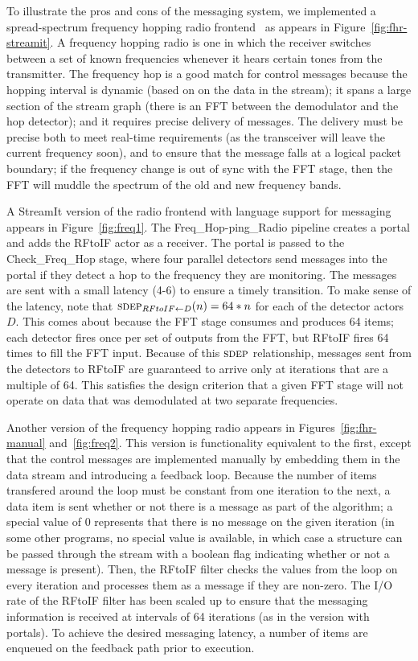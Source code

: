 To illustrate the pros and cons of the messaging system, we
implemented a spread-spectrum frequency hopping radio
frontend~\cite{harada02} as appears in Figure~\ref{fig:fhr-streamit}.
A frequency hopping radio is one in which the receiver switches
between a set of known frequencies whenever it hears certain tones
from the transmitter.  The frequency hop is a good match for control
messages because the hopping interval is dynamic (based on on the data
in the stream); it spans a large section of the stream graph (there is
an FFT between the demodulator and the hop detector); and it requires
precise delivery of messages.  The delivery must be precise both to
meet real-time requirements (as the transceiver will leave the current
frequency soon), and to ensure that the message falls at a logical
packet boundary; if the frequency change is out of sync with the FFT
stage, then the FFT will muddle the spectrum of the old and new
frequency bands.

A StreamIt version of the radio frontend with language support for
messaging appears in Figure~\ref{fig:freq1}.  The Freq\_Hop-ping\_Radio
pipeline creates a portal and adds the RFtoIF actor as a receiver.
The portal is passed to the Check\_Freq\_Hop stage, where four
parallel detectors send messages into the portal if they detect a hop
to the frequency they are monitoring.  The messages are sent with a
small latency (4-6) to ensure a timely transition.  To make sense of
the latency, note that $\sdepf{RFtoIF}{D}(n) = 64*n$ for each of the
detector actors $D$.  This comes about because the FFT stage consumes
and produces 64 items; each detector fires once per set of outputs
from the FFT, but RFtoIF fires 64 times to fill the FFT input.
Because of this $\textsc{sdep}$ relationship, messages sent from the detectors
to RFtoIF are guaranteed to arrive only at iterations that are a
multiple of 64.  This satisfies the design criterion that a given FFT
stage will not operate on data that was demodulated at two separate
frequencies.

Another version of the frequency hopping radio appears in
Figures~\ref{fig:fhr-manual} and~\ref{fig:freq2}.  This version is
functionality equivalent to the first, except that the control
messages are implemented manually by embedding them in the data stream
and introducing a feedback loop.  Because the number of items
transfered around the loop must be constant from one iteration to the
next, a data item is sent whether or not there is a message as part of
the algorithm; a special value of 0 represents that there is no
message on the given iteration (in some other programs, no special
value is available, in which case a structure can be passed through
the stream with a boolean flag indicating whether or not a message is
present).  Then, the RFtoIF filter checks the values from the loop on
every iteration and processes them as a message if they are non-zero.
The I/O rate of the RFtoIF filter has been scaled up to ensure that
the messaging information is received at intervals of 64 iterations
(as in the version with portals).  To achieve the desired messaging
latency, a number of items are enqueued on the feedback path prior to
execution.


